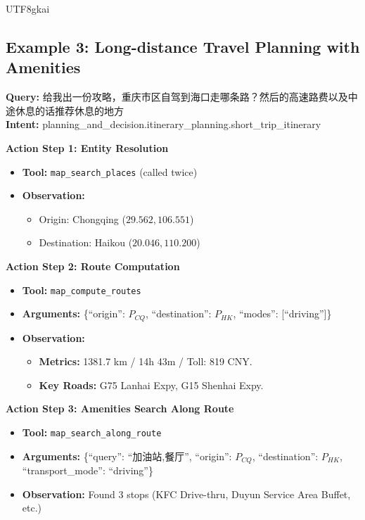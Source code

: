 \documentclass{article} %
\begin{document}
\begin{CJK*}{UTF8}{gkai}
\subsection{Example 3: Long-distance Travel Planning with Amenities}
\begin{tcolorbox}[
    breakable,
    enhanced,
    colframe=color_amapblue,
    colback=mycolor,
    coltitle=white,
    title = {\textbf{Case Study: Cross-province Self-driving Guide}},
    fonttitle=\bfseries
]

\textbf{Query:} 给我出一份攻略，重庆市区自驾到海口走哪条路？然后的高速路费以及中途休息的话推荐休息的地方\\
\textbf{Intent:} planning\_and\_decision.itinerary\_planning.short\_trip\_itinerary
\tcblower

\textbf{Action Step 1: Entity Resolution}
\begin{itemize}[leftmargin=12pt, itemsep=0pt]
  \item \textbf{Tool:} \texttt{map\_search\_places} (called twice)
  \item \textbf{Observation:} 
    \begin{itemize}[leftmargin=10pt, itemsep=0pt]
        \item Origin: Chongqing ($29.562, 106.551$)
        \item Destination: Haikou ($20.046, 110.200$)
    \end{itemize}
\end{itemize}
\vspace{5pt}
\textbf{Action Step 2: Route Computation}
\begin{itemize}[leftmargin=12pt, itemsep=0pt]
  \item \textbf{Tool:} \texttt{map\_compute\_routes}
  \item \textbf{Arguments:} \{``origin'': $P_{CQ}$, ``destination'': $P_{HK}$, ``modes'': [``driving'']\}
  \item \textbf{Observation:} 
    \begin{itemize}[leftmargin=10pt]
        \item \textbf{Metrics:} 1381.7 km / 14h 43m / Toll: 819 CNY.
        \item \textbf{Key Roads:} G75 Lanhai Expy, G15 Shenhai Expy.
    \end{itemize}
\end{itemize}
\vspace{5pt}
\textbf{Action Step 3: Amenities Search Along Route}
\begin{itemize}[leftmargin=12pt, itemsep=0pt]
  \item \textbf{Tool:} \texttt{map\_search\_along\_route}
  \item \textbf{Arguments:} \{``query'': ``加油站,餐厅'', ``origin'': $P_{CQ}$, ``destination'': $P_{HK}$, ``transport\_mode'': ``driving''\}
  \item \textbf{Observation:} Found 3 stops (KFC Drive-thru, Duyun Service Area Buffet, etc.)
\end{itemize}


\end{tcolorbox}
\end{CJK*}
\end{document}
